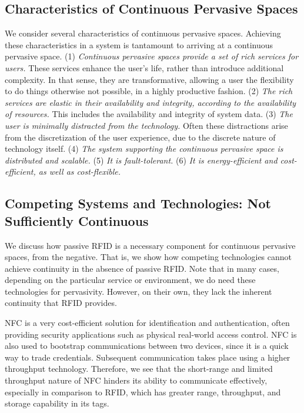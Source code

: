 \subsection{Characteristics of Continuous Pervasive Spaces}
\label{Section: Introduction: Pervasive Computing and Continuous Pervasive Spaces: Characteristics of Continuous Pervasive Spaces}
We consider several characteristics of continuous pervasive spaces. Achieving these characteristics in a system is tantamount to arriving at a continuous pervasive space. (1) \emph{Continuous pervasive spaces provide a set of rich services for users.} These services enhance the user's life, rather than introduce additional complexity. In that sense, they are transformative, allowing a user the flexibility to do things otherwise not possible, in a highly productive fashion. (2) \emph{The rich services are elastic in their availability and integrity, according to the availability of resources.} This includes the availability and integrity of system data. (3) \emph{The user is minimally distracted from the technology.} Often these distractions arise from the discretization of the user experience, due to the discrete nature of technology itself. (4) \emph{The system supporting the continuous pervasive space is distributed and scalable.} (5) \emph{It is fault-tolerant.} (6) \emph{It is energy-efficient and cost-efficient, as well as cost-flexible.}

\subsection{Competing Systems and Technologies: Not Sufficiently Continuous}
We discuss how passive RFID is a necessary component for continuous pervasive spaces, from the negative. That is, we show how competing technologies cannot achieve continuity in the absence of passive RFID. Note that in many cases, depending on the particular service or environment, we do need these technologies for pervasivity. However, on their own, they lack the inherent continuity that RFID provides.

NFC is a very cost-efficient solution for identification and authentication, often providing security applications such as physical real-world access control. NFC is also used to bootstrap communications between two devices, since it is a quick way to trade credentials. Subsequent communication takes place using a higher throughput technology. Therefore, we see that the short-range and limited throughput nature of NFC hinders its ability to communicate effectively, especially in comparison to RFID, which has greater range, throughput, and storage capability in its tags.


